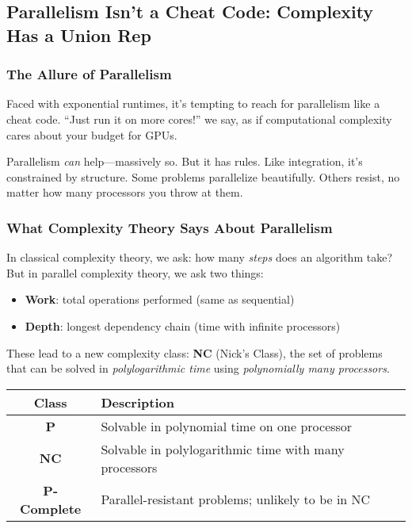 \subsection{Parallelism Isn’t a Cheat Code: Complexity Has a Union Rep}

\subsubsection{The Allure of Parallelism}

Faced with exponential runtimes, it's tempting to reach for parallelism like a cheat code. “Just run it on more cores!” we say, as if computational complexity cares about your budget for GPUs.

Parallelism \textit{can} help—massively so. But it has rules. Like integration, it’s constrained by structure. Some problems parallelize beautifully. Others resist, no matter how many processors you throw at them.

\subsubsection{What Complexity Theory Says About Parallelism}

In classical complexity theory, we ask: how many \emph{steps} does an algorithm take? But in parallel complexity theory, we ask two things:

\begin{itemize}
  \item \textbf{Work}: total operations performed (same as sequential)
  \item \textbf{Depth}: longest dependency chain (time with infinite processors)
\end{itemize}

These lead to a new complexity class: \textbf{NC} (Nick’s Class), the set of problems that can be solved in \textit{polylogarithmic time} using \textit{polynomially many processors}.

\begin{center}
\renewcommand{\arraystretch}{1.4}
\begin{tabular}{|c|l|}
\hline
\textbf{Class} & \textbf{Description} \\ \hline
\textbf{P} & Solvable in polynomial time on one processor \\ \hline
\textbf{NC} & Solvable in polylogarithmic time with many processors \\ \hline
\textbf{P-Complete} & Parallel-resistant problems; unlikely to be in NC \\ \hline
\end{tabular}
\end{center}

